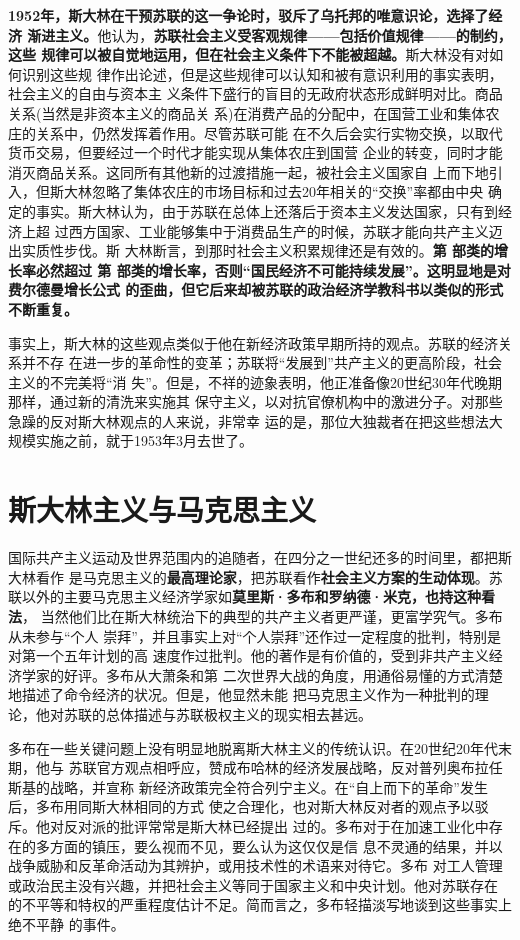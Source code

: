 \textbf{1952年，斯大林在干预苏联的这一争论时，驳斥了乌托邦的唯意识论，选择了经济
  渐进主义。}他认为，\textbf{苏联社会主义受客观规律——包括价值规律——的制约，这些
  规律可以被自觉地运用，但在社会主义条件下不能被超越。}斯大林没有对如何识别这些规
律作出论述，但是这些规律可以认知和被有意识利用的事实表明，社会主义的自由与资本主
义条件下盛行的盲目的无政府状态形成鲜明对比。商品关系(当然是非资本主义的商品关
系)在消费产品的分配中，在国营工业和集体农庄的关系中，仍然发挥着作用。尽管苏联可能
在不久后会实行实物交换，以取代货币交易，但要经过一个时代才能实现从集体农庄到国营
企业的转变，同时才能消灭商品关系。这同所有其他新的过渡措施一起，被社会主义国家自
上而下地引入，但斯大林忽略了集体农庄的市场目标和过去20年相关的“交换”率都由中央
确定的事实。斯大林认为，由于苏联在总体上还落后于资本主义发达国家，只有到经济上超
过西方国家、工业能够集中于消费品生产的时候，苏联才能向共产主义迈出实质性步伐。斯
大林断言，到那时社会主义积累规律还是有效的。\textbf{第 部类的增长率必然超过
  第 部类的增长率，否则“国民经济不可能持续发展”。这明显地是对费尔德曼增长公式
  的歪曲，但它后来却被苏联的政治经济学教科书以类似的形式不断重复。}

事实上，斯大林的这些观点类似于他在新经济政策早期所持的观点。苏联的经济关系并不存
在进一步的革命性的变革；苏联将“发展到”共产主义的更高阶段，社会主义的不完美将“消
失”。但是，不祥的迹象表明，他正准备像20世纪30年代晚期那样，通过新的清洗来实施其
保守主义，以对抗官僚机构中的激进分子。对那些急躁的反对斯大林观点的人来说，非常幸
运的是，那位大独裁者在把这些想法大规模实施之前，就于1953年3月去世了。

\section{斯大林主义与马克思主义}
国际共产主义运动及世界范围内的追随者，在四分之一世纪还多的时间里，都把斯大林看作
是马克思主义的\textbf{最高理论家}，把苏联看作\textbf{社会主义方案的生动体现}。苏
联以外的主要马克思主义经济学家如\textbf{莫里斯·多布和罗纳德·米克，也持这种看法}，
当然他们比在斯大林统治下的典型的共产主义者更严谨，更富学究气。多布从未参与“个人
崇拜”，并且事实上对“个人崇拜”还作过一定程度的批判，特别是对第一个五年计划的高
速度作过批判。他的著作是有价值的，受到非共产主义经济学家的好评。多布从大萧条和第
二次世界大战的角度，用通俗易懂的方式清楚地描述了命令经济的状况。但是，他显然未能
把马克思主义作为一种批判的理论，他对苏联的总体描述与苏联极权主义的现实相去甚远。

多布在一些关键问题上没有明显地脱离斯大林主义的传统认识。在20世纪20年代末期，他与
苏联官方观点相呼应，赞成布哈林的经济发展战略，反对普列奥布拉任斯基的战略，并宣称
新经济政策完全符合列宁主义。在“自上而下的革命”发生后，多布用同斯大林相同的方式
使之合理化，也对斯大林反对者的观点予以驳斥。他对反对派的批评常常是斯大林已经提出
过的。多布对于在加速工业化中存在的多方面的镇压，要么视而不见，要么认为这仅仅是信
息不灵通的结果，并以战争威胁和反革命活动为其辨护，或用技术性的术语来对待它。多布
对工人管理或政治民主没有兴趣，并把社会主义等同于国家主义和中央计划。他对苏联存在
的不平等和特权的严重程度估计不足。简而言之，多布轻描淡写地谈到这些事实上绝不平静
的事件。


